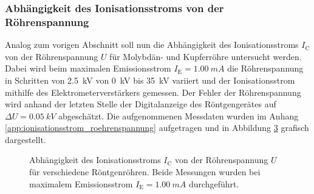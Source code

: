 \documentclass[11pt, a4paper]{article}
\numberwithin{equation}{section}
\begin{document}
\subsubsection{Abhängigkeit des Ionisationsstroms von der Röhrenspannung}
\label{sec:abh_roehrenspannung}
Analog zum vorigen Abschnitt soll nun die Abhängigkeit des Ionisationsstroms $I_\mathrm{C}$ von der Röhrenspannung $U$ für Molybdän- und Kupferröhre untersucht werden.
Dabei wird beim maximalen Emissionsstrom $I_\mathrm{E} = \SI{1.00}{mA}$ die Röhrenspannung in Schritten von \SI{2.5}{kV} von \SI{0}{kV} bis \SI{35}{kV} variiert und der Ionisationsstrom mithilfe des Elektrometerverstärkers gemessen.
Der Fehler der Röhrenspannung wird anhand der letzten Stelle der Digitalanzeige des Röntgengerätes auf $\Delta U = \SI{0.05}{kV}$ abgeschätzt.
Die aufgenommenen Messdaten wurden im Anhang \ref{app:ionisationsstrom_roehrenspannung} aufgetragen und in Abbildung \ref{fig:abh_roehrenspannung} grafisch dargestellt.
\begin{figure}[hp]
	\centering
	\vspace{-10mm}
	
	\begin{subfigure}[b]{1\textwidth}
		
		\label{fig:mo_roehrenspannung}
	\end{subfigure}
	
	\vspace{2.5mm}
	
	\begin{subfigure}[b]{1\textwidth}
		
		\label{fig:cu_roehrenspannung}
	\end{subfigure}
	\caption{Abhängigkeit des Ionisationsstroms $I_\mathrm{C}$ von der Röhrenspannung $U$ für verschiedene Röntgenröhren. Beide Messungen wurden bei maximalem Emissionsstrom $I_\mathrm{E} = \SI{1.00}{mA}$ durchgeführt.}
	\label{fig:abh_roehrenspannung}
\end{figure}
\end{document}
